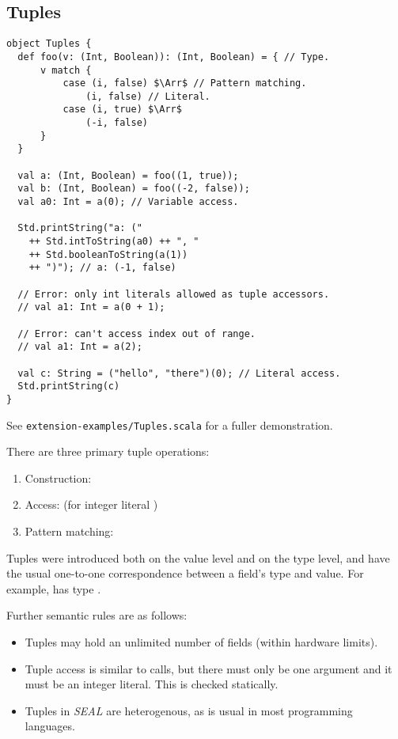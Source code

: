 \subsection{Tuples}

\begin{lstlisting}
object Tuples {
  def foo(v: (Int, Boolean)): (Int, Boolean) = { // Type.
      v match {
          case (i, false) $\Arr$ // Pattern matching.
              (i, false) // Literal.
          case (i, true) $\Arr$
              (-i, false)
      }
  }

  val a: (Int, Boolean) = foo((1, true));
  val b: (Int, Boolean) = foo((-2, false));
  val a0: Int = a(0); // Variable access.

  Std.printString("a: (" 
    ++ Std.intToString(a0) ++ ", " 
    ++ Std.booleanToString(a(1)) 
    ++ ")"); // a: (-1, false)
  
  // Error: only int literals allowed as tuple accessors.
  // val a1: Int = a(0 + 1); 

  // Error: can't access index out of range.
  // val a1: Int = a(2); 
  
  val c: String = ("hello", "there")(0); // Literal access.
  Std.printString(c)
}
\end{lstlisting}
See \texttt{extension-examples/Tuples.scala} for a fuller demonstration.

There are three primary tuple operations:

\begin{enumerate}
  \item Construction: 
  \item Access:  (for integer literal )
  \item Pattern matching: \\
\end{enumerate}

\noindent
Tuples were introduced both on the value level and on the type level, and have the usual one-to-one correspondence between a field's type and value. For example,  has type .

Further semantic rules are as follows:

\begin{itemize}
  \item Tuples may hold an unlimited number of fields (within hardware limits).
  \item Tuple access is similar to calls, but there must only be one argument and it must be an integer literal. This is checked statically.
  \item Tuples in \textit{SEAL} are heterogenous, as is usual in most programming languages.
\end{itemize}

